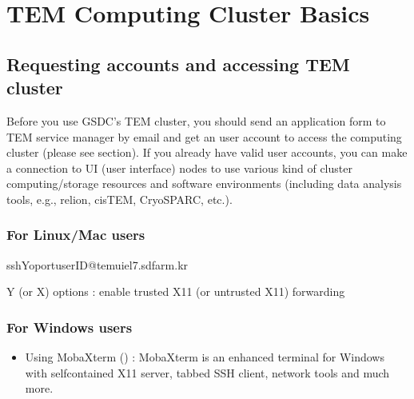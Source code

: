 \documentclass[a4paper,10pt,english]{sphinxmanual}
\begin{document}
\sphinxstepscope


\chapter{TEM Computing Cluster Basics}
\label{\detokenize{guide:tem-computing-cluster-basics}}\label{\detokenize{guide::doc}}

\section{Requesting accounts and accessing TEM cluster}
\label{\detokenize{guide:requesting-accounts-and-accessing-tem-cluster}}\label{\detokenize{guide:requesting-accounts}}
\sphinxAtStartPar
Before you use GSDC’s TEM cluster, you should send an application form to TEM service manager by e\sphinxhyphen{}mail and
get an user account to access the computing cluster (please see  section).
If you already have valid user accounts,
you can make a connection to UI (user interface) nodes to use various kind of cluster computing/storage resources and software environments (including data analysis tools, e.g., relion, cisTEM, CryoSPARC, etc.).


\subsection{For Linux/Mac users}
\label{\detokenize{guide:for-linux-mac-users}}
\begin{sphinxVerbatim}[commandchars=\\\{\}]
\PYGZdl{}\PYGZgt{}ssh\PYGZhy{}Y\PYGZhy{}o\PYGZlt{}port\PYGZgt{}\PYGZlt{}userID\PYGZgt{}@tem\PYGZhy{}ui\PYGZhy{}el7.sdfarm.kr
\end{sphinxVerbatim}

\sphinxAtStartPar
\sphinxhyphen{}Y (or \sphinxhyphen{}X) options : enable trusted X11 (or untrusted X11) forwarding


\subsection{For Windows users}
\label{\detokenize{guide:for-windows-users}}\begin{itemize}
\item {} 
\sphinxAtStartPar
Using MobaXterm () :
MobaXterm is an enhanced terminal for Windows with self\sphinxhyphen{}contained X11 server, tabbed SSH client, network tools and much more.

\end{itemize}
\end{document}
